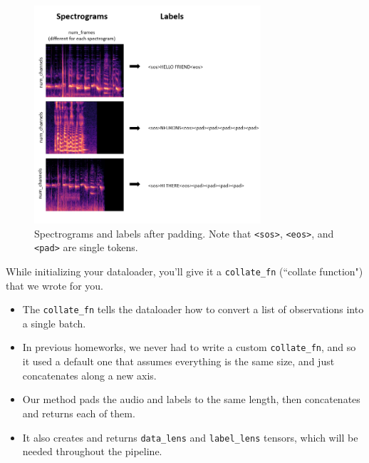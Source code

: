 \documentclass{article}
\newcommand{\ttt}[1]{\texttt{#1}}
\begin{document}
\begin{figure}[h]
\centering
\includegraphics[width=0.75\textwidth]{images/spectrograms_padded.png}
\caption{Spectrograms and labels after padding. Note that \ttt{<sos>}, \ttt{<eos>}, and \ttt{<pad>} are single tokens.}
\end{figure}


While initializing your dataloader, you'll give it a \ttt{collate\_fn} (``collate function") that we wrote for you.

\begin{itemize}
    \item The \ttt{collate\_fn} tells the dataloader how to convert a list of observations into a single batch.
    \item In previous homeworks, we never had to write a custom \ttt{collate\_fn}, and so it used a default one that assumes everything is the same size, and just concatenates along a new axis.
    \item Our method pads the audio and labels to the same length, then concatenates and returns each of them.
    \item It also creates and returns \ttt{data\_lens} and \ttt{label\_lens} tensors, which will be needed throughout the pipeline.
\end{itemize}


\end{document}
